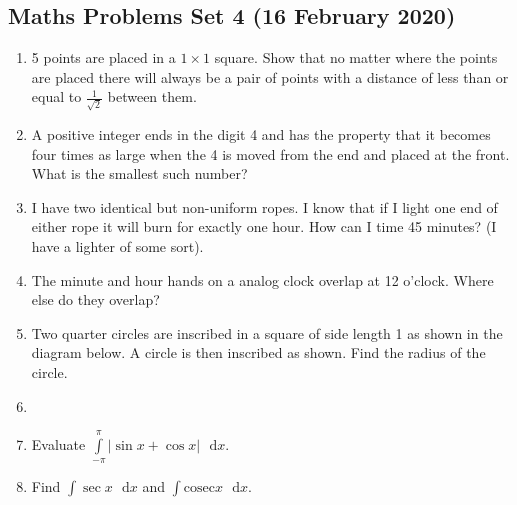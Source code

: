 \documentclass{article}
\begin{document}
\begin{center}
        \section*{Maths Problems Set 4 (16 February 2020)}
\end{center}

\begin{enumerate}
    \item
    5 points are placed in a $1\times1$ square. Show that no matter where the points are placed there will always be a pair of points with a distance of less than or equal to $\frac{1}{\sqrt{2}}$ between them.

    
    \item
    A positive integer ends in the digit 4 and has the property that it becomes four times as large when the 4 is moved from the end and placed at the front. What is the smallest such number?
    
    \item
    I have two identical but non-uniform ropes. I know that if I light one end of either rope it will burn for exactly one hour. How can I time 45 minutes? (I have a lighter of some sort).
    
    \item
    The minute and hour hands on a analog clock overlap at 12 o’clock. Where else do they overlap?
    
    \item
    Two quarter circles are inscribed in a square of side length 1 as shown in the diagram below. A circle is then inscribed as shown. Find the radius of the circle.
    
    
    \item
    
    
    
    \item
    Evaluate $\int \limits_{-\pi}^{\pi} |\sin x + \cos x|\text{ }\mathrm{d}x$.
    
    \item
    Find $\int \sec x \text{ }\mathrm{d}x$ and $\int \mathrm{cosec} x \text{ }\mathrm{d}x$.
    

\end{enumerate}
\end{document}
